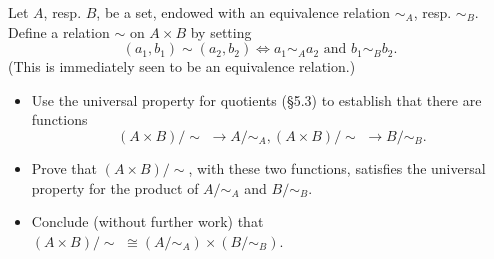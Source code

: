 \documentclass[12pt,letterpaper,boxed]{hmcpset}
\newcommand{\quot}[2]{#1/\!\!#2\,\,}
\newcommand{\quotntws}[2]{#1/\!\!#2}
\begin{document}
\begin{problem}[5.11]
	Let $A$, resp. $B$, be a set, endowed with an equivalence relation $\sim_A$,
	resp. $\sim_B$.
	Define a relation $\sim$ on $A\times B$ by setting
	\[ (a_1, b_1) \sim (a_2, b_2) \iff a_1 \sim_A a_2 \text{ and } b_1 \sim_B b_2. \]
	(This is immediately seen to be an equivalence relation.)
	\begin{itemize}
		\item Use the universal property for quotients (\S5.3) to establish that there are
		functions
		\[ \quot{(A\times B)}{\sim} \to \quotntws{A}{\sim_A},
		\quot{(A\times B)}{\sim} \to \quotntws{B}{\sim_B}. \]
		\item Prove that $\quotntws{(A\times B)}{\sim}$, with these two functions,
		satisfies the universal property for the product of $\quotntws{A}{\sim_A}$ and
		$\quotntws{B}{\sim_B}$.
		\item Conclude (without further work) that $\quot{(A\times
			B)}{\sim}\cong(\quotntws{A}{\sim_A})\times(\quotntws{B}{\sim_B}).$
	\end{itemize}
\end{problem}
\end{document}
